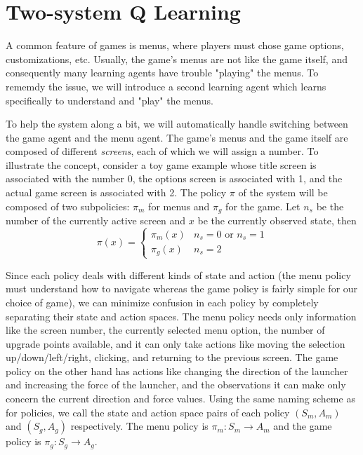 \section{Two-system Q Learning}

A common feature of games is menus, where players must chose game options, customizations, etc.
Usually, the game's menus are not like the game itself, and consequently many learning agents have trouble "playing" the menus.
To rememdy the issue, we will introduce a second learning agent which learns specifically to understand and "play" the menus.

To help the system along a bit, we will automatically handle switching between the game agent and the menu agent.
The game's menus and the game itself are composed of different \emph{screens}, each of which we will assign a number.
To illustrate the concept, consider a toy game example whose title screen is associated with the number 0, the options screen is associated with 1, and the actual game screen is associated with 2.
The policy $ \pi $ of the system will be composed of two subpolicies: $ \pi_m $ for menus and $ \pi_g $ for the game.
Let $ n_s $ be the number of the currently active screen and $ x $ be the currently observed state, then
\begin{equation}
  \pi(x) =
    \begin{cases}
      \pi_m(x) & n_s = 0 \textrm{ or } n_s = 1 \\
      \pi_g(x) & n_s = 2
    \end{cases}
\end{equation}

Since each policy deals with different kinds of state and action (the menu policy must understand how to navigate whereas the game policy is fairly simple for our choice of game), we can minimize confusion in each policy by completely separating their state and action spaces.
The menu policy needs only information like the screen number, the currently selected menu option, the number of upgrade points available, and it can only take actions like moving the selection up/down/left/right, clicking, and returning to the previous screen.
The game policy on the other hand has actions like changing the direction of the launcher and increasing the force of the launcher, and the observations it can make only concern the current direction and force values.
Using the same naming scheme as for policies, we call the state and action space pairs of each policy $ (S_m, A_m) $ and $ (S_g, A_g) $ respectively.
The menu policy is $ \pi_m : S_m \to A_m $ and the game policy is $ \pi_g : S_g \to A_g $. 
